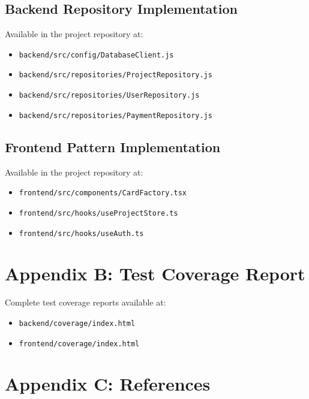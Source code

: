 \documentclass[12pt,a4paper]{article}
\begin{document}
\subsection{Backend Repository Implementation}

Available in the project repository at:
\begin{itemize}
    \item \texttt{backend/src/config/DatabaseClient.js}
    \item \texttt{backend/src/repositories/ProjectRepository.js}
    \item \texttt{backend/src/repositories/UserRepository.js}
    \item \texttt{backend/src/repositories/PaymentRepository.js}
\end{itemize}

\subsection{Frontend Pattern Implementation}

Available in the project repository at:
\begin{itemize}
    \item \texttt{frontend/src/components/CardFactory.tsx}
    \item \texttt{frontend/src/hooks/useProjectStore.ts}
    \item \texttt{frontend/src/hooks/useAuth.ts}
\end{itemize}

\section{Appendix B: Test Coverage Report}

Complete test coverage reports available at:
\begin{itemize}
    \item \texttt{backend/coverage/index.html}
    \item \texttt{frontend/coverage/index.html}
\end{itemize}

\section{Appendix C: References}
\end{document}
